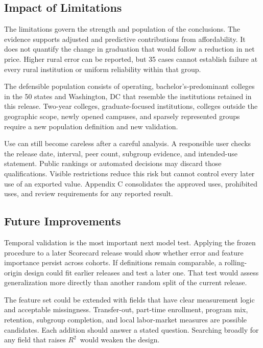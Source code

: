 \documentclass[12pt,a4paper]{article}
\newcommand{\Rtwo}{\ensuremath{R^{2}}}
\begin{document}
\subsection{Impact of Limitations}

The limitations govern the strength and population of the conclusions. The evidence supports adjusted and predictive contributions from affordability. It does not quantify the change in graduation that would follow a reduction in net price. Higher rural error can be reported, but 35 cases cannot establish failure at every rural institution or uniform reliability within that group.

The defensible population consists of operating, bachelor's-predominant colleges in the 50 states and Washington, DC that resemble the institutions retained in this release. Two-year colleges, graduate-focused institutions, colleges outside the geographic scope, newly opened campuses, and sparsely represented groups require a new population definition and new validation.

Use can still become careless after a careful analysis. A responsible user checks the release date, interval, peer count, subgroup evidence, and intended-use statement. Public rankings or automated decisions may discard those qualifications. Visible restrictions reduce this risk but cannot control every later use of an exported value. Appendix C consolidates the approved uses, prohibited uses, and review requirements for any reported result.

\subsection{Future Improvements}

Temporal validation is the most important next model test. Applying the frozen procedure to a later Scorecard release would show whether error and feature importance persist across cohorts. If definitions remain comparable, a rolling-origin design could fit earlier releases and test a later one. That test would assess generalization more directly than another random split of the current release.

The feature set could be extended with fields that have clear measurement logic and acceptable missingness. Transfer-out, part-time enrollment, program mix, retention, subgroup completion, and local labor-market measures are possible candidates. Each addition should answer a stated question. Searching broadly for any field that raises \Rtwo\ would weaken the design.
\end{document}

